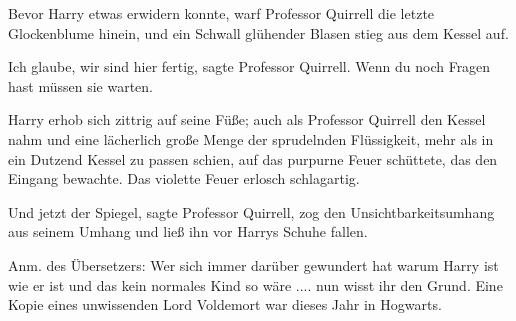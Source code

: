 Bevor Harry etwas erwidern konnte, warf Professor Quirrell die letzte
Glockenblume hinein, und ein Schwall glühender Blasen stieg aus dem Kessel auf.

\glqq{}Ich glaube, wir sind hier fertig\grqq{}, sagte Professor Quirrell. \glqq{}
Wenn du noch Fragen hast müssen sie warten.\grqq{}

Harry erhob sich zittrig auf seine Füße; auch als Professor Quirrell den Kessel
nahm und eine lächerlich große Menge der sprudelnden Flüssigkeit, mehr als in
ein Dutzend Kessel zu passen schien, auf das purpurne Feuer schüttete, das den
Eingang bewachte. Das violette Feuer erlosch schlagartig.

\glqq{}Und jetzt der Spiegel\grqq{}, sagte Professor Quirrell, zog den
Unsichtbarkeitsumhang aus seinem Umhang und ließ ihn vor Harrys Schuhe fallen.


Anm. des Übersetzers: Wer sich immer darüber gewundert hat warum Harry ist wie
er ist und das kein normales Kind so wäre .... nun wisst ihr den Grund. Eine
Kopie eines unwissenden Lord Voldemort war dieses Jahr in Hogwarts.

